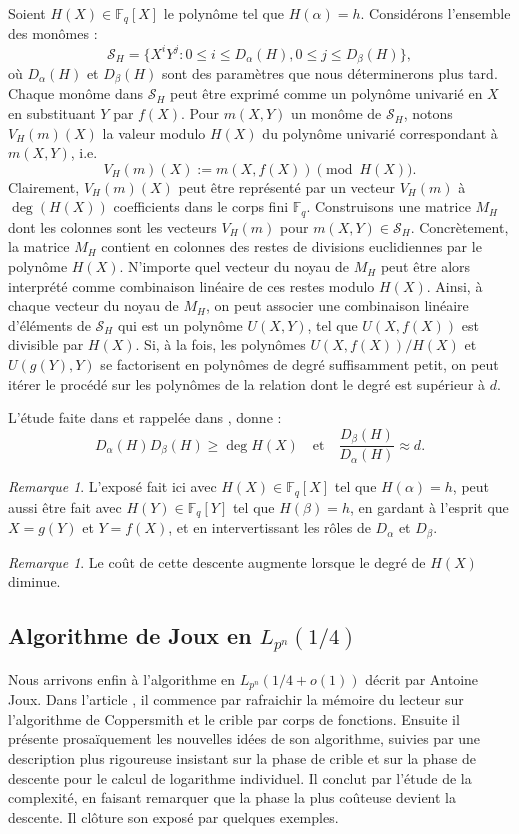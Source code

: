 \documentclass[a4paper, titlepage, 11pt]{article}
\theoremstyle{definition}
\theoremstyle{remark}
\newtheorem{rema}[theo]{Remarque}
\def\o{o}
\def\gf #1{\mathbb{F}_{#1}}
\begin{document}
Soient $H(X)\in\gf{q}[X]$ le polynôme tel que $H(\alpha) = h$. Considérons l'ensemble des monômes :
$$\mathcal S_H = \{X^iY^j : 0 \leqslant i \leqslant D_\alpha(H), 0 \leqslant j \leqslant D_\beta(H)\},$$
où $D_\alpha(H)$ et $D_\beta(H)$ sont des paramètres que nous déterminerons plus tard. Chaque monôme dans $\mathcal S_H$ peut être exprimé comme un polynôme univarié en $X$ en substituant $Y$ par $f(X)$. Pour $m(X,Y)$ un monôme de $\mathcal S_H$, notons $V_H(m)(X)$ la valeur modulo $H(X)$ du polynôme univarié correspondant à $m(X,Y)$, i.e. 
$$V_H(m)(X) := m(X,f(X)) \pmod{H(X)}.$$
Clairement, $V_H(m)(X)$ peut être représenté par un vecteur $V_H(m)$ à $\deg(H(X))$ coefficients dans le corps fini $\gf{q}$. Construisons une matrice $M_H$ dont les colonnes sont les vecteurs $V_H(m)$ pour $m(X,Y) \in \mathcal S_H$. Concrètement, la matrice $M_H$ contient en colonnes des restes de divisions euclidiennes par le polynôme $H(X)$. N'importe quel vecteur du noyau de $M_H$ peut être alors interprété comme combinaison linéaire de ces restes modulo $H(X)$. Ainsi, à chaque vecteur du noyau de $M_H$, on peut associer une combinaison linéaire d'éléments de $\mathcal S_H$ qui est un polynôme $U(X,Y)$, tel que $U(X,f(X))$ est divisible par $H(X)$. Si, à la fois, les polynômes $U(X,f(X))/H(X)$ et $U(g(Y),Y)$ se factorisent en polynômes de degré suffisamment petit, on peut itérer le procédé sur les polynômes de la relation dont le degré est supérieur à $d$.

L'étude faite dans \cite{joux2006, joux2002} et rappelée dans \cite{joux2013}, donne :
$$D_\alpha(H) D_\beta(H) \geqslant \deg H(X) \quad\text{et}\quad \frac{D_\beta(H)}{D_\alpha(H)} \approx d.$$

\begin{rema}
L'exposé fait ici avec $H(X)\in\gf{q}[X]$ tel que $H(\alpha) = h$, peut aussi être fait avec $H(Y)\in\gf{q}[Y]$ tel que $H(\beta) = h$, en gardant à l'esprit que $X = g(Y)$ et $Y = f(X)$, et en intervertissant les rôles de $D_\alpha$ et $D_\beta$.
\end{rema}
\begin{rema}
Le coût de cette descente augmente lorsque le degré de $H(X)$ diminue.
\end{rema}

\subsection{Algorithme de Joux en $L_{p^n}(1/4)$}\label{s-sec:algoJoux}

Nous arrivons enfin à l'algorithme en $L_{p^n}(1/4 + \o(1))$ décrit par Antoine Joux. Dans l'article \cite{joux2013}, il commence par rafraichir la mémoire du lecteur sur l'algorithme de Coppersmith et le crible par corps de fonctions. Ensuite il présente prosaïquement les nouvelles idées de son algorithme, suivies par une description plus rigoureuse insistant sur la phase de crible et sur la phase de descente pour le calcul de logarithme individuel. Il conclut par l'étude de la complexité, en faisant remarquer que la phase la plus coûteuse devient la descente. Il clôture son exposé par quelques exemples.
\end{document}
